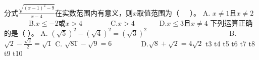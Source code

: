 \markdownRendererDocumentBegin
\markdownRendererOlBeginTight
{}分式$\frac{\sqrt{(x-1)^2-9}}{x-4}$在实数范围内有意义，则$x$取值范围为（~~~）。\markdownRendererOlItemEnd 
\markdownRendererOlEndTight \markdownRendererInterblockSeparator
{}A. $x\neq 1$且$x\neq 2$~~~~~~~B.$x\le-2$或$x>4$~~~~~~~~C.$x>4$~~~~~~~D.$x\le3$且$x\neq4$\markdownRendererInterblockSeparator
{}\markdownRendererOlBeginTight
{}下列运算正确的是（ ）。\markdownRendererOlItemEnd 
\markdownRendererOlEndTight \markdownRendererInterblockSeparator
{}A. $(\sqrt{5})^2-(\sqrt{4})^2=(\sqrt{3})^2$ ~~~~~~~~~~~~~~~~~~~~~~ B.$\sqrt{2}-\frac{\sqrt{2}}{2}=\sqrt{1}$\markdownRendererInterblockSeparator
{}C. $\sqrt{81}-\sqrt{9}=6$ ~~~~~~~ D.$\sqrt{8}+\sqrt{2}=4\sqrt{2}$\markdownRendererInterblockSeparator
{}\markdownRendererOlBeginTight
{}t3\markdownRendererOlItemEnd 
{}t4\markdownRendererOlItemEnd 
{}t5\markdownRendererOlItemEnd 
{}t6\markdownRendererOlItemEnd 
{}t7\markdownRendererOlItemEnd 
{}t8\markdownRendererOlItemEnd 
{}t9\markdownRendererOlItemEnd 
{}t10\markdownRendererOlItemEnd 
\markdownRendererOlEndTight \markdownRendererDocumentEnd